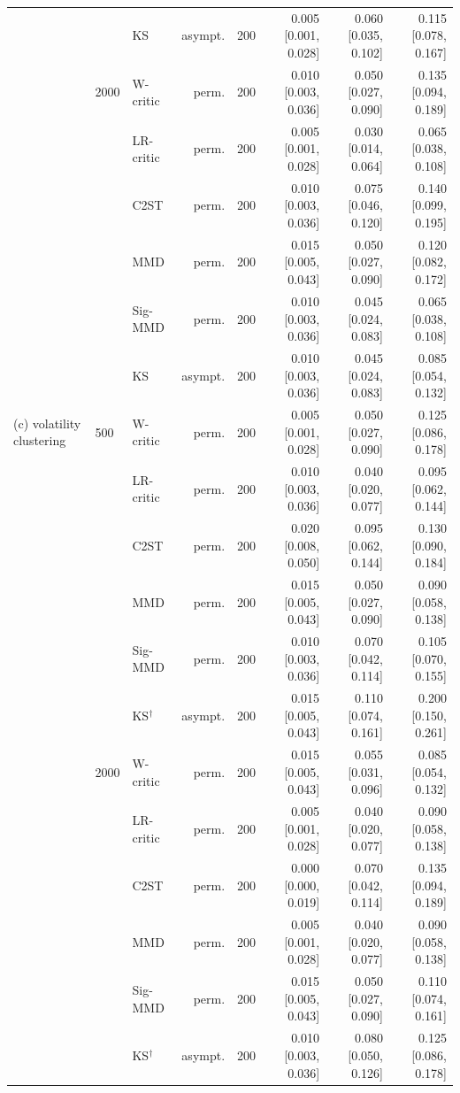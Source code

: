 \begin{tabular}{lllrrrrr}
 &  & KS & asympt. & 200 & 0.005 [0.001, 0.028] & 0.060 [0.035, 0.102] & 0.115 [0.078, 0.167] \\
 & 2000 & W-critic & perm. & 200 & 0.010 [0.003, 0.036] & 0.050 [0.027, 0.090] & 0.135 [0.094, 0.189] \\
 &  & LR-critic & perm. & 200 & 0.005 [0.001, 0.028] & 0.030 [0.014, 0.064] & 0.065 [0.038, 0.108] \\
 &  & C2ST & perm. & 200 & 0.010 [0.003, 0.036] & 0.075 [0.046, 0.120] & 0.140 [0.099, 0.195] \\
 &  & MMD & perm. & 200 & 0.015 [0.005, 0.043] & 0.050 [0.027, 0.090] & 0.120 [0.082, 0.172] \\
 &  & Sig-MMD & perm. & 200 & 0.010 [0.003, 0.036] & 0.045 [0.024, 0.083] & 0.065 [0.038, 0.108] \\
 &  & KS & asympt. & 200 & 0.010 [0.003, 0.036] & 0.045 [0.024, 0.083] & 0.085 [0.054, 0.132] \\
(c) volatility clustering & 500 & W-critic & perm. & 200 & 0.005 [0.001, 0.028] & 0.050 [0.027, 0.090] & 0.125 [0.086, 0.178] \\
 &  & LR-critic & perm. & 200 & 0.010 [0.003, 0.036] & 0.040 [0.020, 0.077] & 0.095 [0.062, 0.144] \\
 &  & C2ST & perm. & 200 & 0.020 [0.008, 0.050] & 0.095 [0.062, 0.144] & 0.130 [0.090, 0.184] \\
 &  & MMD & perm. & 200 & 0.015 [0.005, 0.043] & 0.050 [0.027, 0.090] & 0.090 [0.058, 0.138] \\
 &  & Sig-MMD & perm. & 200 & 0.010 [0.003, 0.036] & 0.070 [0.042, 0.114] & 0.105 [0.070, 0.155] \\
 &  & KS$^{\dagger}$ & asympt. & 200 & 0.015 [0.005, 0.043] & 0.110 [0.074, 0.161] & 0.200 [0.150, 0.261] \\
 & 2000 & W-critic & perm. & 200 & 0.015 [0.005, 0.043] & 0.055 [0.031, 0.096] & 0.085 [0.054, 0.132] \\
 &  & LR-critic & perm. & 200 & 0.005 [0.001, 0.028] & 0.040 [0.020, 0.077] & 0.090 [0.058, 0.138] \\
 &  & C2ST & perm. & 200 & 0.000 [0.000, 0.019] & 0.070 [0.042, 0.114] & 0.135 [0.094, 0.189] \\
 &  & MMD & perm. & 200 & 0.005 [0.001, 0.028] & 0.040 [0.020, 0.077] & 0.090 [0.058, 0.138] \\
 &  & Sig-MMD & perm. & 200 & 0.015 [0.005, 0.043] & 0.050 [0.027, 0.090] & 0.110 [0.074, 0.161] \\
 &  & KS$^{\dagger}$ & asympt. & 200 & 0.010 [0.003, 0.036] & 0.080 [0.050, 0.126] & 0.125 [0.086, 0.178] \\

\end{tabular}
